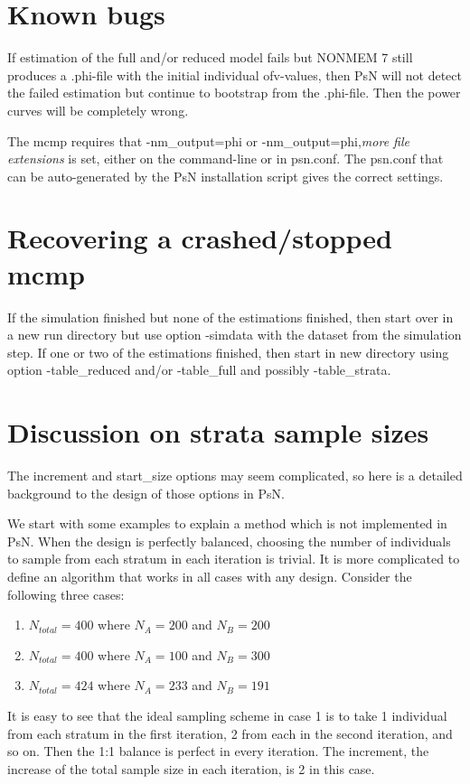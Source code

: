 \section{Known bugs}
If estimation of the full and/or reduced model fails but NONMEM 7 still produces a .phi-file with the initial individual ofv-values, 
then PsN will not detect the failed estimation but continue to bootstrap from the .phi-file. Then the power curves will be completely wrong.

The mcmp requires that -nm\_output=phi or -nm\_output=phi,\emph{more file extensions} is set, either on the command-line or in psn.conf.
The psn.conf that can be auto-generated by the PsN installation script gives the correct settings.

\section{Recovering a crashed/stopped mcmp}
If the simulation finished but none of the estimations finished, then start over in a new run directory but use option -simdata with the dataset from the simulation step. If one or two of the estimations finished, then start in new directory using option -table\_reduced and/or -table\_full and possibly -table\_strata. 

\section{Discussion on strata sample sizes}
The increment and start\_size options may seem complicated, so here is a detailed background to the design of those options in PsN.

We start with some examples to explain a method which is not implemented in PsN. When the design is perfectly balanced, choosing the number of individuals to sample from each stratum in each iteration is trivial. It is more complicated to define an algorithm that works in all cases with any design. Consider the following three cases:

\begin{enumerate}
	\item $N_{total}=400$ where $N_A=200$ and $N_B=200$
	\item $N_{total}=400$ where $N_A=100$ and $N_B=300$
	\item	$N_{total}=424$ where $N_A=233$ and $N_B=191$
\end{enumerate}
It is easy to see that the ideal sampling scheme in case 1 is to take 1 individual from each stratum in the first iteration, 2 from each in the second iteration, and so on. Then the 1:1 balance is perfect in every iteration. The increment, the increase of the total sample size in each iteration, is 2 in this case.

